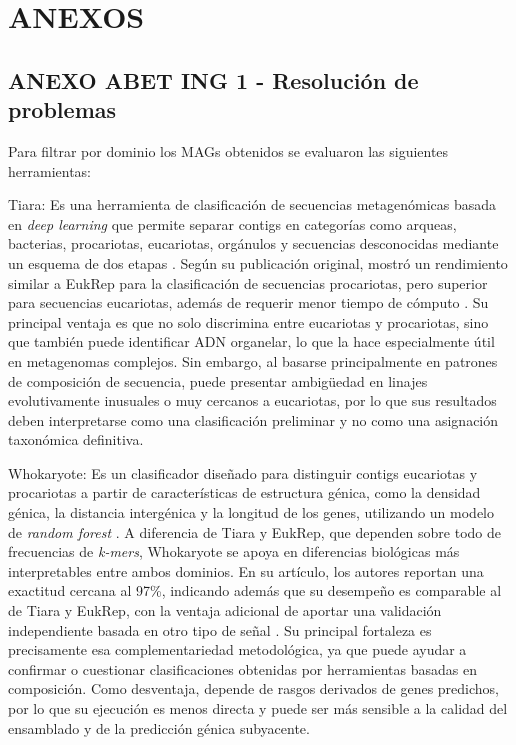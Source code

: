 \chapter*{\center \Large ANEXOS} 

\section*{ANEXO ABET ING 1 - Resolución de problemas}
Para filtrar por dominio los MAGs obtenidos se evaluaron las siguientes herramientas:

Tiara: Es una herramienta de clasificación de secuencias metagenómicas basada en \textit{deep learning} que permite separar contigs en categorías como arqueas, bacterias, procariotas, eucariotas, orgánulos y secuencias desconocidas mediante un esquema de dos etapas \cite{karlicki2022tiara}. Según su publicación original, mostró un rendimiento similar a EukRep para la clasificación de secuencias procariotas, pero superior para secuencias eucariotas, además de requerir menor tiempo de cómputo \cite{karlicki2022tiara}. Su principal ventaja es que no solo discrimina entre eucariotas y procariotas, sino que también puede identificar ADN organelar, lo que la hace especialmente útil en metagenomas complejos. Sin embargo, al basarse principalmente en patrones de composición de secuencia, puede presentar ambigüedad en linajes evolutivamente inusuales o muy cercanos a eucariotas, por lo que sus resultados deben interpretarse como una clasificación preliminar y no como una asignación taxonómica definitiva.

Whokaryote: Es un clasificador diseñado para distinguir contigs eucariotas y procariotas a partir de características de estructura génica, como la densidad génica, la distancia intergénica y la longitud de los genes, utilizando un modelo de \textit{random forest} \cite{pronk2022whokaryote}. A diferencia de Tiara y EukRep, que dependen sobre todo de frecuencias de \textit{k-mers}, Whokaryote se apoya en diferencias biológicas más interpretables entre ambos dominios. En su artículo, los autores reportan una exactitud cercana al 97\%, indicando además que su desempeño es comparable al de Tiara y EukRep, con la ventaja adicional de aportar una validación independiente basada en otro tipo de señal \cite{pronk2022whokaryote}. Su principal fortaleza es precisamente esa complementariedad metodológica, ya que puede ayudar a confirmar o cuestionar clasificaciones obtenidas por herramientas basadas en composición. Como desventaja, depende de rasgos derivados de genes predichos, por lo que su ejecución es menos directa y puede ser más sensible a la calidad del ensamblado y de la predicción génica subyacente.

